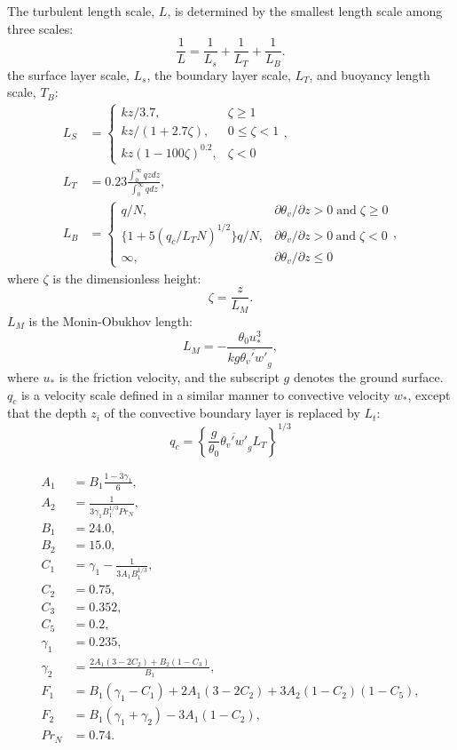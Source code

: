 The turbulent length scale, $L$, is determined by the smallest length scale among three scales:
\begin{equation}
  \frac{1}{L} = \frac{1}{L_s} + \frac{1}{L_T} + \frac{1}{L_B}.
\end{equation}
the surface layer scale, $L_s$, the boundary layer scale, $L_T$, and buoyancy length scale, $T_B$:
\begin{align}
  L_S &= \left\{
  \begin{array}{ll}
    kz/3.7, & \zeta \ge 1 \\
    kz/(1+2.7\zeta), & 0 \le \zeta < 1 \\
    kz(1-100\zeta)^{0.2}, & \zeta < 0
  \end{array}
  \right. , \\
  L_T &= 0.23\frac{\int_0^\infty qz dz}{\int_0^\infty q dz}, \\
  L_B &= \left\{
  \begin{array}{ll}
    q/N,                      & \partial \theta_v/\partial z > 0 \;\mathrm{and}\; \zeta \ge 0 \\
    \{1+5(q_c/L_TN)^{1/2}\}q/N, & \partial \theta_v/\partial z > 0 \:\mathrm{and}\; \zeta < 0 \\
    \infty, & \partial \theta_v/\partial z \le 0
  \end{array}
  \right. ,
\end{align}
where $\zeta$ is the dimensionless height:
\begin{equation}
  \zeta = \frac{z}{L_M}.
\end{equation}
$L_M$ is the Monin-Obukhov length:
\begin{equation}
  L_M = -\frac{\theta_0 u_*^3}{kg\overline{\theta_v'w'}_g},
\end{equation}
where $u_*$ is the friction velocity, and the subscript $g$ denotes the ground surface.
$q_c$ is a velocity scale defined in a similar manner to convective velocity $w_*$, except that the depth $z_i$ of the convective boundary layer is replaced by $L_t$:
\begin{equation}
  q_c = \left\{\frac{g}{\theta_0}\overline{\theta_v' w'}_gL_T\right\}^{1/3}
\end{equation}


\begin{align}
  A_1 &= B_1\frac{1-3\gamma_1}{6}, \\
  A_2 &= \frac{1}{3\gamma_1 B_1^{1/3} Pr_N}, \\
  B_1 &= 24.0, \\
  B_2 &= 15.0, \\
  C_1 &= \gamma_1 - \frac{1}{3A_1B_1^{1/3}}, \\
  C_2 &= 0.75, \\
  C_3 &= 0.352, \\
  C_5 &= 0.2, \\
  \gamma_1 &= 0.235, \\
  \gamma_2 &= \frac{2A_1(3-2C_2)+B_2(1-C_3)}{B_1}, \\
  F_1 &= B_1(\gamma_1-C_1)+2A_1(3-2C_2)+3A_2(1-C_2)(1-C_5), \\
  F_2 &= B_1(\gamma_1+\gamma_2)-3A_1(1-C_2), \\
  Pr_N &= 0.74.
\end{align}


